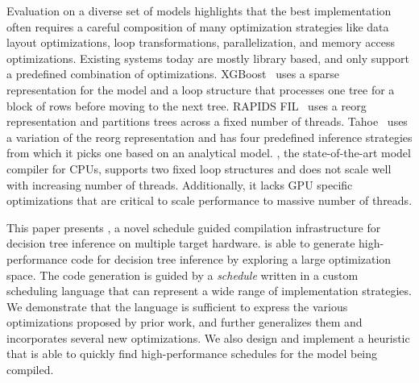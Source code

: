 Evaluation on a diverse set of models highlights that the best implementation often requires a careful composition 
of many optimization strategies like data layout optimizations, 
loop transformations, parallelization, and memory access optimizations. 
Existing systems today are mostly library based, and only support a predefined combination of optimizations. 
XGBoost~\cite{XGBoost} uses a sparse representation for the model and a loop structure that processes one tree for a block of rows before moving to 
the next tree. RAPIDS FIL~\cite{FIL} uses a reorg representation and partitions trees across a fixed number of threads. Tahoe~\cite{Tahoe} uses a
variation of the reorg representation and has four predefined inference strategies from which it picks one based on an analytical model.
\TreebeardOLD{}, the state-of-the-art model compiler for CPUs, supports two fixed loop structures and does not scale well with increasing number of threads. Additionally, it lacks GPU specific optimizations that are critical to scale performance to massive number of threads.

This paper presents \Treebeard{}, a novel schedule guided compilation infrastructure for decision tree inference on multiple target hardware. \Treebeard{} is able to generate high-performance code for decision tree inference by exploring a large optimization space. The code generation is guided by a \emph{schedule} written in a custom scheduling language that can represent a wide range of implementation strategies. We demonstrate that the language is sufficient to express the various optimizations proposed by prior work, and further generalizes them and incorporates several new optimizations. We also design and implement a heuristic that is able to quickly find high-performance schedules for the model being compiled.
